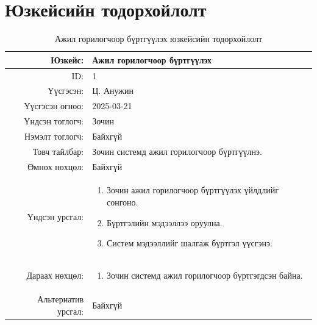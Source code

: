 \section{Юзкейсийн тодорхойлолт}
\begin{longtable}{|r|p{11.5cm}|}
    \caption{Ажил горилогчоор бүртгүүлэх юзкейсийн тодорхойлолт}
    \label{table:usecase1}\\ \hline
    {Юзкейс:} & {Ажил горилогчоор бүртгүүлэх}\\ \hline
    {ID:} & {1}\\ \hline
    {Үүсгэсэн:} & {Ц. Анужин}\\ \hline
    {Үүсгэсэн огноо:} & {2025-03-21}\\ \hline
    {Үндсэн тоглогч:} & {Зочин}\\ \hline
    {Нэмэлт тоглогч:} & {Байхгүй}\\ \hline
    {Товч тайлбар:} & {Зочин системд ажил горилогчоор бүртгүүлнэ.}\\ \hline
    {Өмнөх нөхцөл:} & {Байхгүй}\\ \hline
    {Үндсэн урсгал:} & {\begin{enumerate}[nosep]
        \item Зочин ажил горилогчоор бүртгүүлэх үйлдлийг сонгоно.
        \item Бүртгэлийн мэдээллээ оруулна.
        \item Систем мэдээллийг шалгаж бүртгэл үүсгэнэ.
    \end{enumerate}}\\ \hline
    {Дараах нөхцөл:} & {\begin{enumerate}[nosep]
        \item Зочин системд ажил горилогчоор бүртгэгдсэн байна.
    \end{enumerate}}\\ \hline
    {Альтернатив урсгал:} & {Байхгүй}\\ \hline
\end{longtable}

